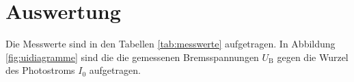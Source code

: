 \section{Auswertung}
\label{sec:Auswertung}
Die Messwerte sind in den Tabellen \ref{tab:messwerte} aufgetragen.
In Abbildung \ref{fig:uidiagramme} sind die die gemessenen Bremsspannungen $U_\text{B}$ gegen die Wurzel des Photostroms $I_0$ aufgetragen.
